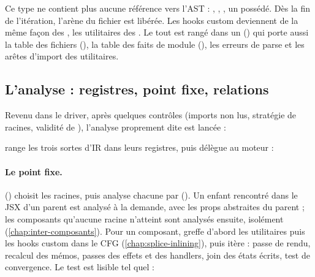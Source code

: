 
Ce type ne contient plus aucune référence vers l'AST : , , , un  possédé. Dès la fin de l'itération, l'arène du fichier est libérée. Les hooks custom deviennent de la même façon des , les utilitaires des . Le tout est rangé dans un  () qui porte aussi la table des fichiers (), la table des faits de module (), les erreurs de parse et les arêtes d'import des utilitaires.

\subsection{L'analyse : registres, point fixe, relations}

Revenu dans le driver, après quelques contrôles (imports non lus, stratégie de racines, validité de ), l'analyse proprement dite est lancée :


 range les trois sortes d'IR dans leurs registres, puis délègue au moteur :


\paragraph{Le point fixe.}  () choisit les racines, puis analyse chacune par  (). Un enfant rencontré dans le JSX d'un parent est analysé à la demande, avec les props abstraites du parent ; les composants qu'aucune racine n'atteint sont analysés ensuite, isolément (\cref{chap:inter-composants}). Pour un composant,  greffe d'abord les utilitaires puis les hooks custom dans le CFG (\cref{chap:splice-inlining}), puis itère : passe de rendu, recalcul des mémos, passes des effets et des handlers, join des états écrits, test de convergence. Le test est lisible tel quel :


